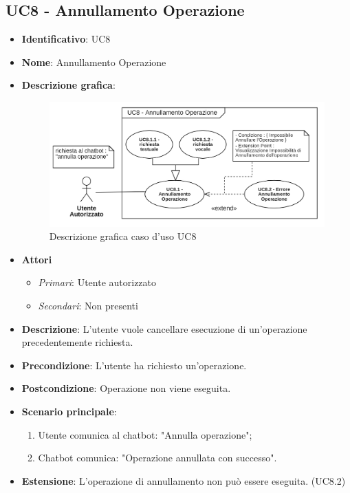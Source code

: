 \subsection{UC8 - Annullamento Operazione }
\begin{itemize}
	\item \textbf{Identificativo}: UC8
	\item \textbf{Nome}: Annullamento Operazione
  \item \textbf{Descrizione grafica}:

  \begin{figure}[h]
    \centering
    \includegraphics[scale=0.60]{images/UC8.png} 
    \caption{Descrizione grafica caso d'uso UC8}
 \end{figure}

	\item \textbf{Attori}
	\begin{itemize} 
		\item \textit{Primari}: Utente autorizzato
		\item \textit{Secondari}: Non presenti
	\end{itemize}
	\item \textbf{Descrizione}: L'utente vuole cancellare esecuzione di un'operazione precedentemente richiesta.
	\item \textbf{Precondizione}: L'utente ha richiesto un'operazione.
	\item \textbf{Postcondizione}: Operazione non viene eseguita.
	\item \textbf{Scenario principale}: \begin{enumerate}
		\item Utente comunica al chatbot: "Annulla operazione";
		\item Chatbot comunica: "Operazione annullata con successo".
	\end{enumerate}
  \item \textbf{Estensione}: L'operazione di annullamento non può essere eseguita. (UC8.2)
\end{itemize}

